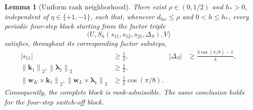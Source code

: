 \documentclass[]{article}
\numberwithin{equation}{section}
\theoremstyle{plain}
\newtheorem{lemma}[theorem]{Lemma}
\theoremstyle{remark}
\newcommand{\norm}[1]{\left\lVert #1\right\rVert}
\begin{document}
\begin{lemma}[Uniform rank neighborhood]
\label{lem:desingularized-rank-neighborhood}
There exist \(\rho\in(0,1/2)\) and \(h_*>0\), independent of
\(\eta\in\{+1,-1\}\), such that, whenever \(d_{\mathrm{fac}}\le\rho\) and
\(0<h\le h_*\), every periodic four-step block starting from the factor
triple
\[
 \bigl(U,S_h(s_{11},s_{12},s_{21},\Delta_S),V\bigr)
\]
satisfies, throughout its corresponding factor substeps,
\begin{equation}\label{eq:appendix-uniform-denominators}
\begin{aligned}
 |s_{11}|&\ge\frac12,
 &|\Delta_S|&\ge\frac{3\cos(\pi/8)-1}{4},\\
 \norm{\boldsymbol k_1}_2,\norm{\boldsymbol\lambda_1}_2
 &\ge\frac12,\\
 \norm{\boldsymbol w_K\times\boldsymbol k_1}_2,
 \norm{\boldsymbol w_L\times\boldsymbol\lambda_1}_2
 &\ge\frac12\cos(\pi/8).
\end{aligned}
\end{equation}
Consequently, the complete block is rank-admissible.  The same
conclusion holds for the four-step switch-off block.
\end{lemma}
\end{document}
